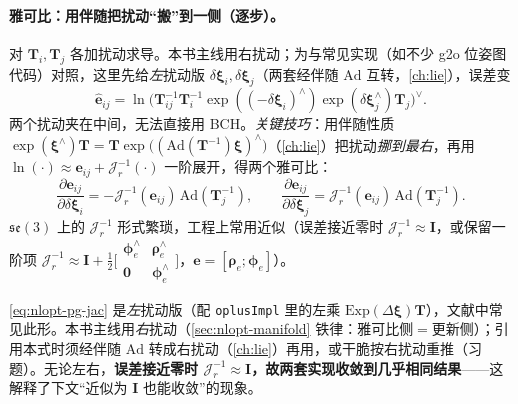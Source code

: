 \paragraph{雅可比：用伴随把扰动“搬”到一侧（逐步）。}\cite{gaoxiang2019slam14}
对 $\mathbf{T}_i,\mathbf{T}_j$ 各加扰动求导。本书主线用右扰动；为与常见实现（如不少 g2o 位姿图代码）对照，这里先给\emph{左}扰动版 $\delta\boldsymbol{\xi}_i,\delta\boldsymbol{\xi}_j$（两套经伴随 $\mathrm{Ad}$ 互转，\cref{ch:lie}），误差变
\begin{equation}
  \hat{\mathbf{e}}_{ij}=\ln\!\big(\mathbf{T}_{ij}^{-1}\mathbf{T}_i^{-1}\exp((-\delta\boldsymbol{\xi}_i)^\wedge)\exp(\delta\boldsymbol{\xi}_j^\wedge)\mathbf{T}_j\big)^\vee.
  \label{eq:nlopt-pg-pert}
\end{equation}
两个扰动夹在中间，无法直接用 BCH。\emph{关键技巧}：用伴随性质 $\exp(\boldsymbol{\xi}^\wedge)\mathbf{T}=\mathbf{T}\exp\big((\mathrm{Ad}(\mathbf{T}^{-1})\boldsymbol{\xi})^\wedge\big)$（\cref{ch:lie}）把扰动\emph{挪到最右}，再用 $\ln(\cdot)\approx\mathbf{e}_{ij}+\mathcal{J}_r^{-1}(\cdot)$ 一阶展开，得两个雅可比：
\begin{equation}
  \frac{\partial\mathbf{e}_{ij}}{\partial\delta\boldsymbol{\xi}_i}=-\mathcal{J}_r^{-1}(\mathbf{e}_{ij})\,\mathrm{Ad}(\mathbf{T}_j^{-1}),\qquad
  \frac{\partial\mathbf{e}_{ij}}{\partial\delta\boldsymbol{\xi}_j}=\mathcal{J}_r^{-1}(\mathbf{e}_{ij})\,\mathrm{Ad}(\mathbf{T}_j^{-1}).
  \label{eq:nlopt-pg-jac}
\end{equation}
$\mathfrak{se}(3)$ 上的 $\mathcal{J}_r^{-1}$ 形式繁琐，工程上常用近似（误差接近零时 $\mathcal{J}_r^{-1}\approx\mathbf{I}$，或保留一阶项 $\mathcal{J}_r^{-1}\approx\mathbf{I}+\tfrac12\big[\begin{smallmatrix}\boldsymbol{\phi}_e^\wedge&\boldsymbol{\rho}_e^\wedge\\\mathbf{0}&\boldsymbol{\phi}_e^\wedge\end{smallmatrix}\big]$，$\mathbf{e}=[\boldsymbol{\rho}_e;\boldsymbol{\phi}_e]$）。

\begin{insight}
\cref{eq:nlopt-pg-jac} 是\emph{左}扰动版（配 \texttt{oplusImpl} 里的左乘 $\mathrm{Exp}(\Delta\boldsymbol{\xi})\mathbf{T}$），文献中常见此形\cite{gaoxiang2019slam14}。本书主线用\emph{右}扰动（\cref{sec:nlopt-manifold} 铁律：雅可比侧$=$更新侧）；引用本式时须经伴随 $\mathrm{Ad}$ 转成右扰动（\cref{ch:lie}）再用，或干脆按右扰动重推（习题）。无论左右，\textbf{误差接近零时 $\mathcal{J}_r^{-1}\approx\mathbf{I}$，故两套实现收敛到几乎相同结果}——这解释了下文“近似为 $\mathbf{I}$ 也能收敛”的现象。
\end{insight}

